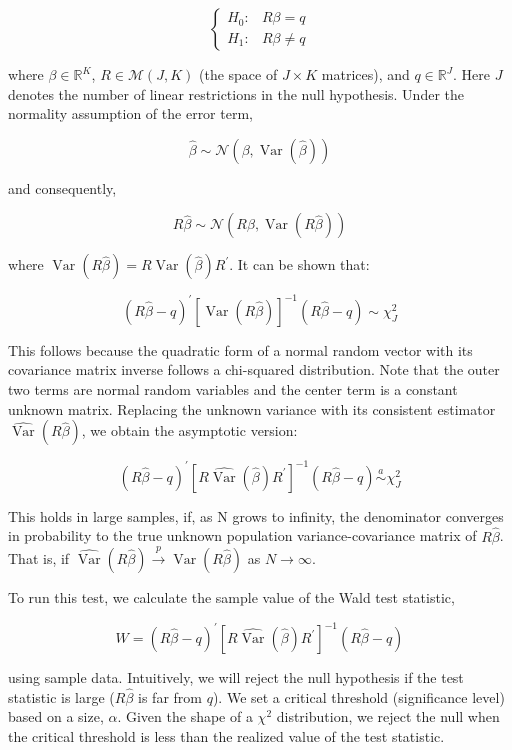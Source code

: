 \[
\begin{cases}
    H_{0}: & R\beta = q \\ 
    H_{1}: & R\beta \neq q 
\end{cases}
\]

where $\beta \in \mathbb{R}^{K}$, $R \in \mathcal{M}(J, K)$ (the space of $J \times K$ matrices), and $q \in \mathbb{R}^{J}$. Here $J$ denotes the number of linear restrictions in the null hypothesis. Under the normality assumption of the error term,

\[
\widehat{\beta} \sim \mathcal{N}\left(\beta, \operatorname{Var}(\widehat{\beta})\right)
\]

and consequently,

\[
R\widehat{\beta} \sim \mathcal{N}\left(R\beta, \operatorname{Var}(R\widehat{\beta})\right)
\]

where $\operatorname{Var}(R\widehat{\beta}) = R\operatorname{Var}(\widehat{\beta})R^{\prime}$. It can be shown that:

\[
(R\widehat{\beta} - q)^{\prime} \left[\operatorname{Var}(R\widehat{\beta})\right]^{-1} (R\widehat{\beta} - q) \sim \chi_{J}^{2}
\]

This follows because the quadratic form of a normal random vector with its covariance matrix inverse follows a chi-squared distribution. Note that the outer two terms are normal random variables and the center term is a constant unknown matrix. Replacing the unknown variance with its consistent estimator $\widehat{\operatorname{Var}}(R\widehat{\beta})$, we obtain the asymptotic version:

\[
(R\widehat{\beta} - q)^{\prime} \left[R\widehat{\operatorname{Var}}(\widehat{\beta})R^{\prime}\right]^{-1} (R\widehat{\beta} - q) \stackrel{a}{\sim} \chi_{J}^{2}
\]

This holds in large samples, if, as N grows to infinity, the denominator converges in probability to the true unknown population variance-covariance matrix of $R \hat{\beta}$. That is, if $\widehat{\operatorname{Var}}(R\widehat{\beta}) \xrightarrow{p} \operatorname{Var}(R\widehat{\beta})$ as $N \to \infty$.

To run this test, we calculate the sample value of the Wald test statistic,

\[
W = (R\widehat{\beta} - q)^{\prime} \left[R\widehat{\operatorname{Var}}(\widehat{\beta})R^{\prime}\right]^{-1} (R\widehat{\beta} - q)
\]

using sample data. Intuitively, we will reject the null hypothesis if the test statistic is large ($R \hat{\beta}$ is far from $q$). We set a critical threshold (significance level) based on a size, $\alpha$. Given the shape of a $\chi^2$ distribution, we reject the null when the critical threshold is less than the realized value of the test statistic. 

